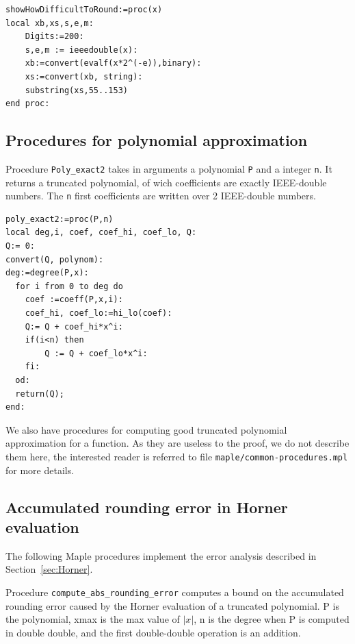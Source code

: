 \begin{lstlisting}[caption={showHowDifficultToRound},firstnumber=1]
showHowDifficultToRound:=proc(x)
local xb,xs,s,e,m:
    Digits:=200:
    s,e,m := ieeedouble(x):
    xb:=convert(evalf(x*2^(-e)),binary):
    xs:=convert(xb, string):
    substring(xs,55..153)
end proc:
\end{lstlisting}


\subsection{Procedures for polynomial approximation}


Procedure \texttt{Poly\_exact2} takes in arguments a polynomial
\texttt{P} and a integer \texttt{n}. It returns a truncated
polynomial, of wich coefficients are exactly IEEE-double numbers. The
\texttt{n} first coefficients are written over 2 IEEE-double numbers.

\begin{lstlisting}[caption={poly\_exact2},firstnumber=1]
poly_exact2:=proc(P,n)
local deg,i, coef, coef_hi, coef_lo, Q:
Q:= 0:
convert(Q, polynom):
deg:=degree(P,x):
  for i from 0 to deg do
    coef :=coeff(P,x,i):
    coef_hi, coef_lo:=hi_lo(coef):
    Q:= Q + coef_hi*x^i:
    if(i<n) then
        Q := Q + coef_lo*x^i:
    fi:
  od:
  return(Q);
end:
\end{lstlisting}
\vspace{0.5cm}


We also have procedures for computing good truncated polynomial
approximation for a function. As they are useless to the proof, we do
not describe them here, the interested reader is referred to file
\texttt{maple/common-procedures.mpl} for more details.










\subsection{Accumulated rounding error in Horner evaluation
 \label{sec:Horner-maple}}



The following Maple procedures implement the error analysis described
in Section~\ref{sec:Horner}.

Procedure \texttt{compute\_abs\_rounding\_error} computes a bound on
the accumulated rounding error caused by the Horner evaluation of a
truncated polynomial. P is the polynomial, xmax is the max value of
$|x|$, n is the degree when P is computed in double double, and the
first double-double operation is an addition.

